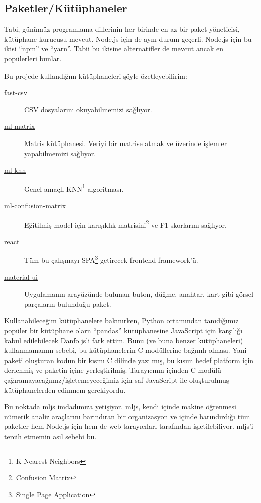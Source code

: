 \documentclass[a4paper,12pt]{article}
\begin{document}
\subsection{Paketler/Kütüphaneler}

Tabi, günümüz programlama dillerinin her birinde en az bir paket yöneticisi, kütüphane kurucusu mevcut.
Node.js için de aynı durum geçerli.
Node.js için bu ikisi ``npm'' ve ``yarn''.
Tabii bu ikisine alternatifler de mevcut ancak en popülerleri bunlar.

Bu projede kullandığım kütüphaneleri şöyle özetleyebilirim:

\begin{description}
 \item[\href{https://c2fo.github.io/fast-csv/}{fast-csv}] CSV dosyalarını okuyabilmemizi sağlıyor.
 \item[\href{https://mljs.github.io/matrix/}{ml-matrix}] Matris kütüphanesi. Veriyi bir matrise atmak ve üzerinde işlemler yapabilmemizi sağlıyor.
 \item[\href{https://github.com/mljs/knn}{ml-knn}] Genel amaçlı KNN\footnote{K-Nearest Neighbors} algoritması.
 \item[\href{https://github.com/mljs/confusion-matrix}{ml-confusion-matrix}] Eğitilmiş model için karışıklık matrisini\footnote{Confusion Matrix} ve F1 skorlarını sağlıyor.
 \item[\href{https://reactjs.org/}{react}] Tüm bu çalışmayı SPA\footnote{Single Page Application} getirecek frontend framework'ü.
 \item[\href{https://material-ui.com/}{material-ui}] Uygulamanın arayüzünde bulunan buton, düğme, anahtar, kart gibi görsel parçaların bulunduğu paket.
\end{description}

Kullanabileceğim kütüphanelere bakınırken, Python ortamından tanıdığımız popüler bir kütüphane olarn ``\href{https://pandas.pydata.org/}{pandas}'' kütüphanesine JavaScript için karşılığı kabul edilebilecek \href{https://danfo.jsdata.org/}{Danfo.js}'i fark ettim.
Bunu (ve buna benzer kütüphaneleri) kullanmamamın sebebi, bu kütüphanelerin C modüllerine bağımlı olması.
Yani paketi oluşturan kodun bir kısmı C dilinde yazılmış, bu kısım hedef platform için derlenmiş ve paketin içine yerleştirilmiş.
Tarayıcının içinden C modülü çağıramayacağımız/işletemeyeceğimiz için saf JavaScript ile oluşturulmuş kütüphanelerden edinmem gerekiyordu.

Bu noktada \href{https://github.com/mljs/}{mljs} imdadımıza yetişiyor.
mljs, kendi içinde makine öğrenmesi nümerik analiz araçlarını barındıran bir organizasyon ve içinde barındırdığı tüm paketler hem Node.js için hem de web tarayıcıları tarafından işletilebiliyor.
mljs'i tercih etmemin asıl sebebi bu.
\end{document}
